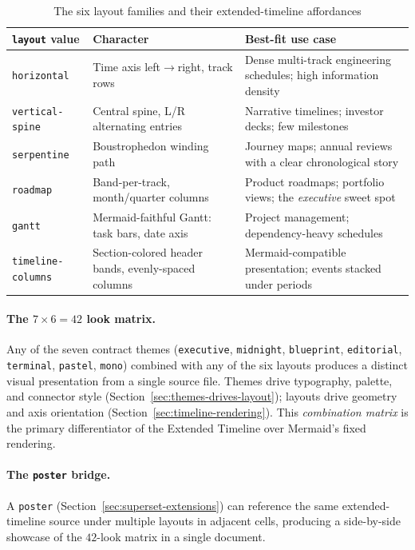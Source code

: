 \begin{table}[h]
\centering\small
\caption{The six layout families and their extended-timeline affordances}
\label{tab:et-layouts}
\begin{tabular}{lp{4.2cm}p{6.5cm}}
\toprule
\textbf{\texttt{layout} value} & \textbf{Character} & \textbf{Best-fit use case} \\
\midrule
\texttt{horizontal}       & Time axis left$\rightarrow$right, track rows
  & Dense multi-track engineering schedules; high information density \\
\texttt{vertical-spine}   & Central spine, L/R alternating entries
  & Narrative timelines; investor decks; few milestones \\
\texttt{serpentine}       & Boustrophedon winding path
  & Journey maps; annual reviews with a clear chronological story \\
\texttt{roadmap}          & Band-per-track, month/quarter columns
  & Product roadmaps; portfolio views; the \emph{executive} sweet spot \\
\texttt{gantt}            & Mermaid-faithful Gantt: task bars, date axis
  & Project management; dependency-heavy schedules \\
\texttt{timeline-columns} & Section-colored header bands, evenly-spaced columns
  & Mermaid-compatible presentation; events stacked under periods \\
\bottomrule
\end{tabular}
\end{table}

\paragraph{The $7 \times 6 = 42$ look matrix.}
Any of the seven contract themes (\texttt{executive}, \texttt{midnight},
\texttt{blueprint}, \texttt{editorial}, \texttt{terminal}, \texttt{pastel},
\texttt{mono}) combined with any of the six layouts produces a distinct
visual presentation from a single source file.  Themes drive typography,
palette, and connector style (Section~\ref{sec:themes-drives-layout});
layouts drive geometry and axis orientation
(Section~\ref{sec:timeline-rendering}).  This \emph{combination matrix} is
the primary differentiator of the Extended Timeline over Mermaid's fixed
rendering.

\paragraph{The \texttt{poster} bridge.}
A \texttt{poster} (Section~\ref{sec:superset-extensions}) can reference the
same extended-timeline source under multiple layouts in adjacent cells,
producing a side-by-side showcase of the $42$-look matrix in a single
document.

